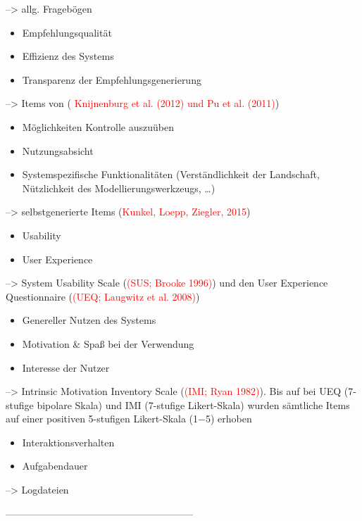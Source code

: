 \documentclass[ngerman, a4paper, abstract=false, twoside=false, parskip=half, DIV=12, bibtotoc]{scrartcl}
\begin{document}
--> allg. Fragebögen

\begin{itemize}
\item Empfehlungsqualität
\item Effizienz des Systems
\item Transparenz der Empfehlungsgenerierung
\end{itemize}


--> Items von (\textcolor{red}{ Knijnenburg et al. (2012) und Pu et al. (2011)})

\begin{itemize}
\item Möglichkeiten Kontrolle auszuüben
\item Nutzungsabsicht
\item Systemspezifische Funktionalitäten (Verständlichkeit der Landschaft, Nützlichkeit des Modellierungswerkzeugs, …)
\end{itemize}


--> selbstgenerierte Items (\textcolor{red}{Kunkel, Loepp, Ziegler, 2015})

\begin{itemize}
\item Usability
\item User Experience
\end{itemize}


-->  System Usability Scale (\textcolor{red}{(SUS; Brooke 1996)}) und den User Experience Questionnaire (\textcolor{red}{(UEQ; Laugwitz et al. 2008)}) 

\begin{itemize}
\item Genereller Nutzen des Systems
\item Motivation & Spaß bei der Verwendung
\item Interesse der Nutzer
\end{itemize}


--> Intrinsic Motivation Inventory Scale (\textcolor{red}{(IMI; Ryan 1982)}). Bis auf bei UEQ (7-stufige bipolare Skala) und IMI (7-stufige Likert-Skala) wurden sämtliche Items auf einer positiven 5-stufigen Likert-Skala (1−5) erhoben

\begin{itemize}
\item Interaktionsverhalten
\item Aufgabendauer
\end{itemize}


--> Logdateien

---------------------------------------------------------




%
\end{document}
